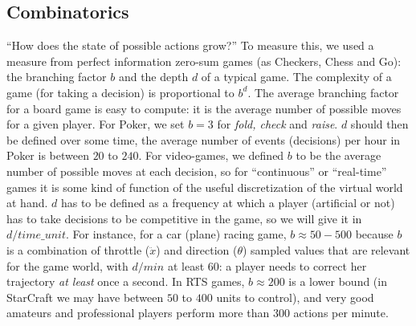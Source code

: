 \subsection{Combinatorics}
``How does the state of possible actions grow?'' To measure this, we used a measure from perfect information zero-sum games (as Checkers, Chess and Go): the branching factor $b$ and the depth $d$ of a typical game. The complexity of a game (for taking a decision) is proportional to $b^d$. The average branching factor for a board game is easy to compute: it is the average number of possible moves for a given player. For Poker, we set $b=3$ for \textit{fold, check} and \textit{raise}. $d$ should then be defined over some time, the average number of events (decisions) per hour in Poker is between $20$ to $240$. For video-games, we defined $b$ to be the average number of possible moves at each decision, so for ``continuous'' or ``real-time'' games it is some kind of function of the useful discretization of the virtual world at hand. $d$ has to be defined as a frequency at which a player (artificial or not) has to take decisions to be competitive in the game, so we will give it in $d/time\_unit$. For instance, for a car (plane) racing game, $b \approx 50-500$ because $b$ is a combination of throttle ($\ddot{x}$) and direction ($\theta$) sampled values that are relevant for the game world, with $d/min$ at least $60$: a player needs to correct her trajectory \textit{at least} once a second. In RTS games, $b \approx 200$ is a lower bound (in StarCraft we may have between $50$ to $400$ units to control), and very good amateurs and professional players perform more than $300$ actions per minute.

